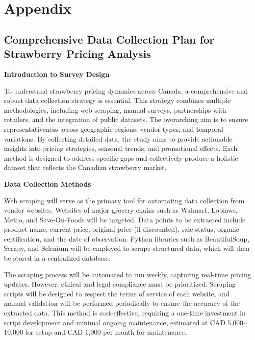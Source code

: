 \documentclass[
  letterpaper,
  DIV=11,
  numbers=noendperiod]{scrartcl}
\begin{document}
\newpage

\appendix

\section*{Appendix}\label{appendix}

\subsection{Comprehensive Data Collection Plan for Strawberry Pricing
Analysis}\label{comprehensive-data-collection-plan-for-strawberry-pricing-analysis}

\textbf{Introduction to Survey Design}

To understand strawberry pricing dynamics across Canada, a comprehensive
and robust data collection strategy is essential. This strategy combines
multiple methodologies, including web scraping, manual surveys,
partnerships with retailers, and the integration of public datasets. The
overarching aim is to ensure representativeness across geographic
regions, vendor types, and temporal variations. By collecting detailed
data, the study aims to provide actionable insights into pricing
strategies, seasonal trends, and promotional effects. Each method is
designed to address specific gaps and collectively produce a holistic
dataset that reflects the Canadian strawberry market.

\textbf{Data Collection Methods}

Web scraping will serve as the primary tool for automating data
collection from vendor websites. Websites of major grocery chains such
as Walmart, Loblaws, Metro, and Save-On-Foods will be targeted. Data
points to be extracted include product name, current price, original
price (if discounted), sale status, organic certification, and the date
of observation. Python libraries such as BeautifulSoup, Scrapy, and
Selenium will be employed to scrape structured data, which will then be
stored in a centralized database.

The scraping process will be automated to run weekly, capturing
real-time pricing updates. However, ethical and legal compliance must be
prioritized. Scraping scripts will be designed to respect the terms of
service of each website, and manual validation will be performed
periodically to ensure the accuracy of the extracted data. This method
is cost-effective, requiring a one-time investment in script development
and minimal ongoing maintenance, estimated at CAD 5,000--10,000 for
setup and CAD 1,000 per month for maintenance.
\end{document}
